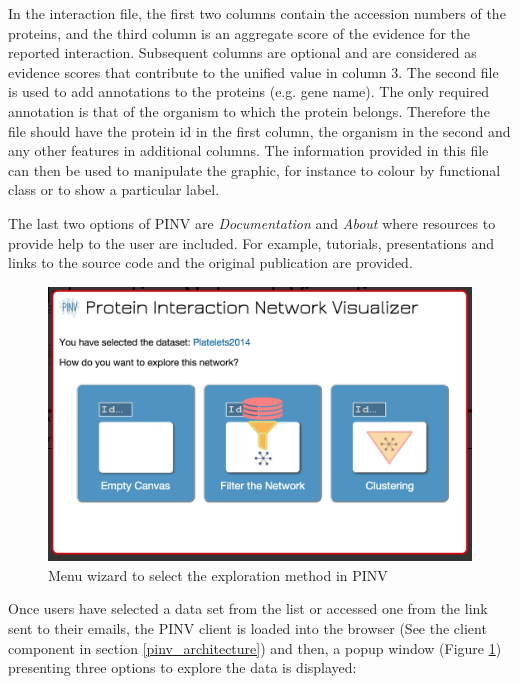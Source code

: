 In the interaction file, the first two columns contain the accession numbers of the proteins, and the third column is an aggregate score of the evidence for the reported interaction. Subsequent columns are optional and are considered as evidence scores that contribute to the unified value in column 3.
The second file is used to add annotations to the proteins (e.g. gene name). The only required annotation is that of the organism to which the protein belongs. Therefore the file should have the protein id in the first column, the organism in the second and any other features in additional columns. The information provided in this file can then be used to manipulate the graphic, for instance to colour by functional class or to show a particular label.

The last two options of PINV are \emph{Documentation} and \emph{About} where resources to provide help to the user are included. For example, tutorials, presentations and links to the source code and the original publication are provided.

\begin{figure}[ht]
\centering
\includegraphics[width=\textwidth]{figures/pinv_wizard.png}
\caption[Menu wizard to select the exploration method in PINV]{Menu wizard to select the exploration method in PINV
\label{fig:pinv_wizard}}
\end{figure}

Once users have selected a data set from the list or accessed one from the link sent to their emails, the PINV client is loaded into the browser (See the client component in section \ref{pinv_architecture}) and then, a popup window (Figure \ref{fig:pinv_wizard}) presenting three options to explore the data is displayed:

